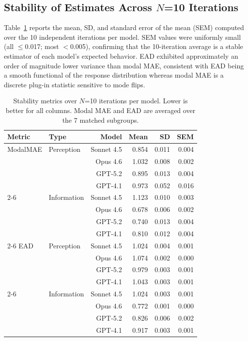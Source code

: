 \subsection{Stability of Estimates Across $N$=10 Iterations}

Table~\ref{tab:stability} reports the mean, SD, and standard error of the mean
(SEM) computed over the 10 independent iterations per model. SEM values were
uniformly small (all $\le$0.017; most $<$0.005), confirming that the
10-iteration average is a stable estimator of each model's expected behavior.
EAD exhibited approximately an order of magnitude lower variance than modal
MAE, consistent with EAD being a smooth functional of the response distribution
whereas modal MAE is a discrete plug-in statistic sensitive to mode flips.

\begin{table}[htbp]
\centering
\scriptsize
\setlength{\tabcolsep}{4pt}
\caption{Stability metrics over $N$=10 iterations per model. Lower is better for all columns. Modal MAE and EAD are averaged over the 7 matched subgroups.}
\label{tab:stability}
\begin{tabular}{llrrrr}
\toprule
\textbf{Metric} & \textbf{Type} & \textbf{Model} & \textbf{Mean} & \textbf{SD} & \textbf{SEM} \\
\midrule
ModalMAE & Perception & Sonnet 4.5 & 0.854 & 0.011 & 0.004 \\
 &  & Opus 4.6 & 1.032 & 0.008 & 0.002 \\
 &  & GPT-5.2 & 0.895 & 0.013 & 0.004 \\
 &  & GPT-4.1 & 0.973 & 0.052 & 0.016 \\
\cmidrule(lr){2-6}
 & Information & Sonnet 4.5 & 1.123 & 0.010 & 0.003 \\
 &  & Opus 4.6 & 0.678 & 0.006 & 0.002 \\
 &  & GPT-5.2 & 0.740 & 0.013 & 0.004 \\
 &  & GPT-4.1 & 0.810 & 0.012 & 0.004 \\
\cmidrule(lr){2-6}
EAD & Perception & Sonnet 4.5 & 1.024 & 0.004 & 0.001 \\
 &  & Opus 4.6 & 1.074 & 0.002 & 0.000 \\
 &  & GPT-5.2 & 0.979 & 0.003 & 0.001 \\
 &  & GPT-4.1 & 1.043 & 0.003 & 0.001 \\
\cmidrule(lr){2-6}
 & Information & Sonnet 4.5 & 1.024 & 0.003 & 0.001 \\
 &  & Opus 4.6 & 0.772 & 0.001 & 0.000 \\
 &  & GPT-5.2 & 0.826 & 0.006 & 0.002 \\
 &  & GPT-4.1 & 0.917 & 0.003 & 0.001 \\
\midrule
\bottomrule
\end{tabular}
\end{table}


